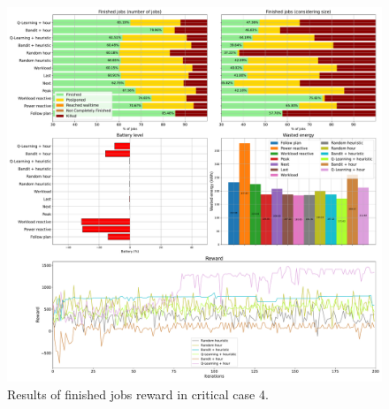\begin{figure}[!htb]
    \centering
    \includegraphics[scale=0.29]{Images/Learning_compensations/reward_finished_touched_profile_worst_workload_2_with_noise_state_delta.pdf}
    \caption{Results of finished jobs reward in critical case 4.}
    \label{fig:touched_reward_results_critical_4}
\end{figure}







